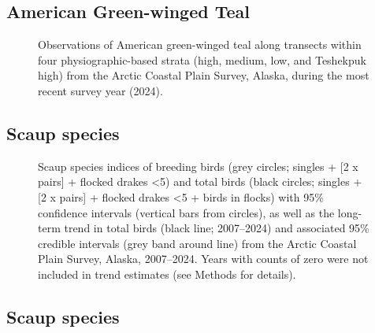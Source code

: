 \documentclass[
]{article}
\begin{document}
\subsection*{American Green-winged
Teal}\label{american-green-winged-teal-2}

\begin{figure}


\caption{\label{fig-GWTEmap}Observations of American green-winged teal
along transects within four physiographic-based strata (high, medium,
low, and Teshekpuk high) from the Arctic Coastal Plain Survey, Alaska,
during the most recent survey year (2024).}

\end{figure}%

\newpage{}

\subsection*{Scaup species}\label{scaup-species}

\begin{figure}


\caption{\label{fig-UNSC}Scaup species indices of breeding birds (grey
circles; singles + {[}2 x pairs{]} + flocked drakes \textless5) and
total birds (black circles; singles + {[}2 x pairs{]} + flocked drakes
\textless5 + birds in flocks) with 95\% confidence intervals (vertical
bars from circles), as well as the long-term trend in total birds (black
line; 2007--2024) and associated 95\% credible intervals (grey band
around line) from the Arctic Coastal Plain Survey, Alaska, 2007--2024.
Years with counts of zero were not included in trend estimates (see
Methods for details).}

\end{figure}%

\newpage{}

\subsection*{Scaup species}\label{scaup-species-1}
\end{document}
